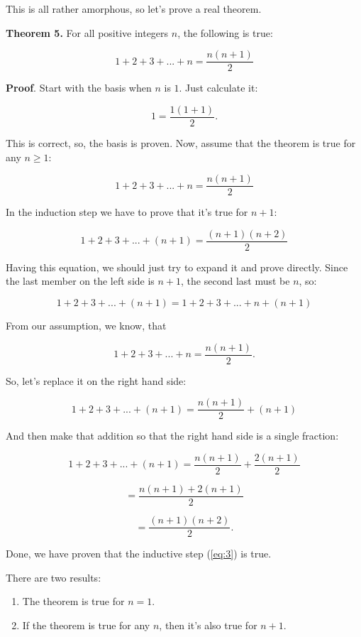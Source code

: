 \documentclass[12pt, a4paper, justified, notitlepage, sfsidenotes, notoc]{book}
\begin{document}
This is all rather amorphous, so let's prove a real theorem.

\textbf{Theorem 5.} For all positive integers \(n\), the following is true:

\begin{equation}
\label{eq:1}
1 + 2 + 3 + ... + n = \frac{n(n+1)}{2}
\end{equation}

\textbf{Proof}. Start with the basis when \(n\) is \(1\). Just calculate it:

$$ 1 = \frac{1(1+1)}{2}. $$

This is correct, so, the basis is proven. Now, assume that the theorem is true for any \(n\geq1\):

\begin{equation}
\label{eq:2}
1 + 2 + 3 + ... + n = \frac{n(n+1)}{2}
\end{equation}

In the induction step we have to prove that it's true for \(n+1\):

\begin{equation}
\label{eq:3}
1 + 2 + 3 + ... + (n+1) = \frac{(n+1)(n+2)}{2}
\end{equation}


Having this equation, we should just try to expand it and prove directly. Since the last member on the left side is \(n+1\), the second last must be \(n\), so:

$$ 1 + 2 + 3 + ... + (n + 1) = 1 + 2 + 3 + ... + n + (n+1) $$

From our assumption, we know, that

$$ 1 + 2 + 3 + ... + n = \frac{n(n+1)}{2}. $$

So, let's replace it on the right hand side:

$$ 1 + 2 + 3 + ... + (n + 1) = \frac{n(n+1)}{2} + (n+1) $$

And then make that addition so that the right hand side is a single fraction:

$$ 1 + 2 + 3 + ... + (n + 1) = \frac{n(n+1)}{2} + \frac{2(n+1)}{2} $$

$$ = \frac{n(n+1) + 2(n+1)}{2} $$

$$ = \frac{(n+1)(n+2)}{2}. $$

Done, we have proven that the inductive step (\ref{eq:3}) is true.

There are two results:

\begin{enumerate}
\item The theorem is true for \(n=1\).
\item If the theorem is true for any \(n\), then it's also true for \(n+1\).
\end{enumerate}
\end{document}
